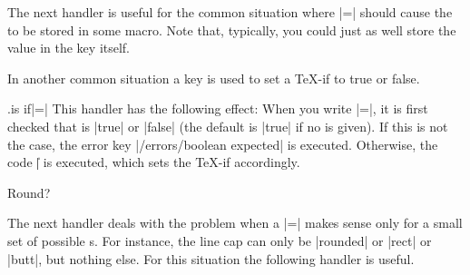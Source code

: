 The next handler is useful for the common situation where
|=| should cause the  to be stored in some
macro. Note that, typically, you could just as well store the value in the key
itself.



In another common situation a key is used to set a \TeX-if to true or false.

\begin{handler}{{.is if}|=|}
    This handler has the following effect: When you write
    |=|, it is first checked that  is |true|
    or |false| (the default is |true| if no  is given). If this is
    not the case, the error key |/errors/boolean expected| is executed.
    Otherwise, the code |\| is executed, which
    sets the \TeX-if accordingly.
\begin{codeexample}[]
\newif\iftheworldisflat
{}
\iftheworldisflat
  Flat
\else
  Round?
\fi
\end{codeexample}
\end{handler}

The next handler deals with the problem when a |=| makes
sense only for a small set of possible s. For instance, the line
cap can only be |rounded| or |rect| or |butt|, but nothing else. For this
situation the following handler is useful.

